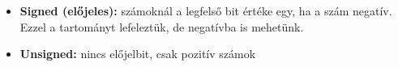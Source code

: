\documentclass[11pt,a4paper]{article}
\begin{document}
            \begin{tcolorbox}[colback=blue!5!white,colframe=blue!50!black,title= 9. Ismertesse számpéldán keresztül a negatív egész számok kettes komplemens ábrázolását!]
                \begin{itemize}
                    \item \textbf{Signed (előjeles):} számoknál a legfelső bit értéke egy, ha a szám negatív. Ezzel a tartományt lefeleztük, de negatívba is mehetünk.
                    \item \textbf{Unsigned:} nincs előjelbit, csak pozitív számok
                \end{itemize}
                \begin{center}
                \end{center}
            \end{tcolorbox}
\end{document}

